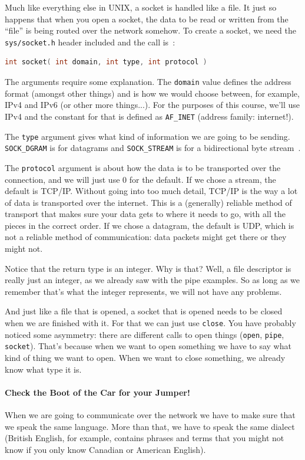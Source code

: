 Much like everything else in UNIX, a socket is handled like a file. It just so happens that when you open a socket, the data to be read or written from the ``file'' is being routed over the network somehow. To create a socket, we need the \texttt{sys/socket.h} header included and the call is~\cite{apunix}:

\begin{lstlisting}[language=C]
int socket( int domain, int type, int protocol )
\end{lstlisting}

The arguments require some explanation. The \texttt{domain} value defines the address format (amongst other things) and is how we would choose between, for example, IPv4 and IPv6 (or other more things...). For the purposes of this course, we'll use IPv4 and the constant for that is defined as \texttt{AF\_INET} (address family: internet!). 

The \texttt{type} argument gives what kind of information we are going to be sending. \texttt{SOCK\_DGRAM} is for datagrams and \texttt{SOCK\_STREAM} is for a bidirectional byte stream~\cite{apunix}.

The \texttt{protocol} argument is about how the data is to be transported over the connection, and we will just use 0 for the default. If we chose a stream, the default is TCP/IP. Without going into too much detail, TCP/IP is the way a lot of data is transported over the internet. This is a (generally) reliable method of transport that makes sure your data gets to where it needs to go, with all the pieces in the correct order. If we chose a datagram, the default is UDP, which is not a reliable method of communication: data packets might get there or they might not.

Notice that the return type is an integer. Why is that? Well, a file descriptor is really just an integer, as we already saw with the pipe examples. So as long as we remember that's what the integer represents, we will not have any problems.

And just like a file that is opened, a socket that is opened needs to be closed when we are finished with it. For that we can just use \texttt{close}. You have probably noticed some asymmetry: there are different calls to open things (\texttt{open}, \texttt{pipe}, \texttt{socket}). That's because when we want to open something we have to say what kind of thing we want to open. When we want to close something, we already know what type it is.

\paragraph{Check the Boot of the Car for your Jumper!}
When we are going to communicate over the network we have to make sure that we speak the same language. More than that, we have to speak the same dialect (British English, for example, contains phrases and terms that you might not know if you only know Canadian or American English). 

